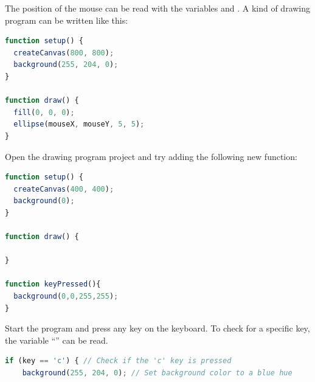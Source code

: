 \begin{exercisebox}[adjusted title=Interaction with the Mouse]
The position of the mouse can be read with the variables 
and . A kind of drawing program can be written like this:

\begin{lstlisting}[language=JavaScript]
function setup() {
  createCanvas(800, 800);
  background(255, 204, 0);
}

function draw() {
  fill(0, 0, 0);
  ellipse(mouseX, mouseY, 5, 5);
}

\end{lstlisting}

\end{exercisebox}

\begin{exercisebox}[adjusted title=Keyboard input]
Open the drawing program project and try adding the following new function:

\begin{lstlisting}[language=JavaScript]
function setup() {
  createCanvas(400, 400);
  background(0);
}

function draw() {
  
}

function keyPressed(){
  background(0,0,255,255);
}
\end{lstlisting}

Start the program and press any key on the keyboard. To
check for a specific key, the variable ``'' can be read.

\begin{lstlisting}[language=JavaScript]
 if (key == 'c') { // Check if the 'c' key is pressed
    background(255, 204, 0); // Set background color to a blue hue
\end{lstlisting}
\end{exercisebox}

